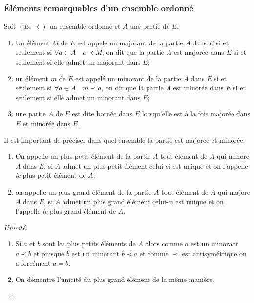 \subsubsection{Éléments remarquables d'un ensemble ordonné}
\label{chap3-subsubsec:elementremarquables}
Soit $(E,\prec)$ un ensemble ordonné et $A$ une partie de $E$.
\begin{defdef}
\begin{enumerate}
\item Un élément $M$ de $E$ est appelé un majorant de la partie $A$ dans $E$ si et seulement si $\forall a \in A \quad a \prec M$, on dit que la partie $A$ est majorée dans $E$ si et seulement si elle admet un majorant dans $E$;
\item un élément $m$ de $E$ est appelé un minorant de la partie $A$ dans $E$ si et seulement si $\forall a \in A \quad m \prec a$, on dit que la partie $A$ est minorée dans $E$ si et seulement si elle admet un minorant dans $E$;
\item une partie $A$ de $E$ est dite bornée dans $E$ lorsqu'elle est à la fois majorée dans $E$ et minorée dans $E$.
\end{enumerate}
Il est important de préciser dans quel ensemble la partie est majorée et minorée.
\end{defdef}
%
\begin{defdef}
\begin{enumerate}
\item On appelle un plus petit élément de la partie $A$ tout élément de $A$ qui minore $A$ dans $E$, si $A$ admet un plus petit élément celui-ci est unique et on l'appelle \emph{le} plus petit élément de $A$;
\item on appelle un plus grand élément de la partie $A$ tout élément de $A$ qui majore $A$ dans $E$, si $A$ admet un plus grand élément celui-ci est unique et on l'appelle \emph{le} plus grand élément de $A$.
\end{enumerate}
\end{defdef}
\begin{proof}[Unicité]
\begin{enumerate}
\item Si $a$ et $b$ sont les plus petits éléments de $A$ alors comme $a$ est un minorant $a \prec b$ et puisque $b$ est un minorant $b \prec a$ et comme $\prec$ est antisymétrique on a forcément $a=b$.
\item On démontre l'unicité du plus grand élément de la même manière.
\end{enumerate}
\end{proof}
